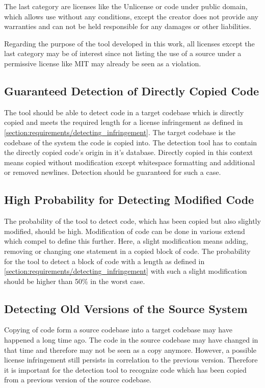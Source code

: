 The last category are licenses like the Unlicense or code under public domain, which allows use without any conditions, except the creator does not provide any warranties and can not be held responsible for any damages or other liabilities.

Regarding the purpose of the tool developed in this work, all licenses except the last category may be of interest since not listing the use of a source under a permissive license like MIT may already be seen as a violation.

\subsection{Guaranteed Detection of Directly Copied Code}\label{section:requirements/guaranteed_detection}
The tool should be able to detect code in a target codebase which is directly copied and meets the required length for a license infringement as defined in \autoref{section:requirements/detecting_infringement}.
The target codebase is the codebase of the system the code is copied into.
The detection tool has to contain the directly copied code's origin in it's database.
Directly copied in this context means copied without modification except whitespace formatting and additional or removed newlines.
Detection should be guaranteed for such a case.

\subsection{High Probability for Detecting Modified Code}\label{section:requirements/high_probability}
The probability of the tool to detect code, which has been copied but also slightly modified, should be high.
Modification of code can be done in various extend which compel to define this further.
Here, a slight modification means adding, removing or changing one statement in a copied block of code.
The probability for the tool to detect a block of code with a length as defined in \autoref{section:requirements/detecting_infringement} with such a slight modification should be higher than 50\% in the worst case. %

\subsection{Detecting Old Versions of the Source System}\label{section:requirements/detecting_old_version}
Copying of code form a source codebase into a target codebase may have happened a long time ago.
The code in the source codebase may have changed in that time and therefore may not be seen as a copy anymore.
However, a possible license infringement still persists in correlation to the previous version.
Therefore it is important for the detection tool to recognize code which has been copied from a previous version of the source codebase.

